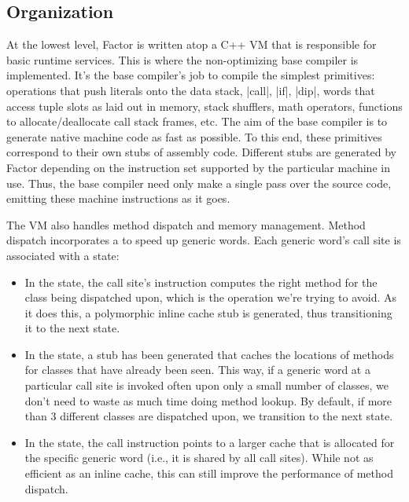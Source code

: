 \subsection{Organization}\label{sec:compiler:vm}

At the lowest level, Factor is written atop a C++ \gls{VM} that is responsible
for basic runtime services.  This is where the non-optimizing base compiler is
implemented.  It's the base compiler's job to compile the simplest primitives:
operations that push literals onto the data stack, \factor|call|, \factor|if|,
\factor|dip|, words that access tuple slots as laid out in memory, stack
shufflers, math operators, functions to allocate/deallocate call stack frames,
etc.  The aim of the base compiler is to generate native machine code as fast
as possible.  To this end, these primitives correspond to their own stubs of
assembly code.  Different stubs are generated by Factor depending on the
instruction set supported by the particular machine in use.  Thus, the base
compiler need only make a single pass over the source code, emitting these
machine instructions as it goes.

The \gls{VM} also handles method dispatch and memory management.  Method
dispatch incorporates a  to speed up generic
words.  Each generic word's call site is associated with a state:
\begin{itemize}
  \item In the  state, the call site's instruction computes the
        right method for the class being dispatched upon, which is the
        operation we're trying to avoid.  As it does this, a polymorphic inline
        cache stub is generated, thus transitioning it to the next state.
  \item In the  state, a stub has been generated that caches
        the locations of methods for classes that have already been seen.  This
        way, if a generic word at a particular call site is invoked often upon
        only a small number of classes, we don't need to waste as much time
        doing method lookup.  By default, if more than $3$ different classes
        are dispatched upon, we transition to the next state.
  \item In the  state, the call instruction points to a
        larger cache that is allocated for the specific generic word (i.e., it
        is shared by all call sites).  While not as efficient as an inline
        cache, this can still improve the performance of method dispatch.
\end{itemize}

